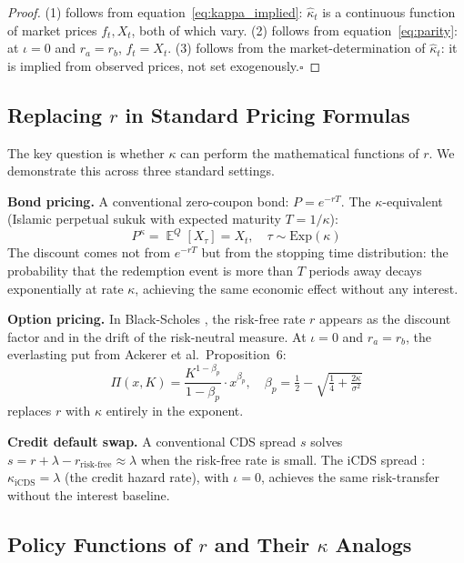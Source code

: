 \documentclass[10pt,twocolumn]{article}
\theoremstyle{plain}
\theoremstyle{definition}
\DeclareMathOperator{\E}{\mathbb{E}}
\begin{document}
\begin{proof}
(1) follows from equation~\eqref{eq:kappa_implied}: $\hat\kappa_t$
is a continuous function of market prices $f_t, X_t$, both of
which vary. (2) follows from equation~\eqref{eq:parity}: at
$\iota = 0$ and $r_a = r_b$, $f_t = X_t$. (3) follows from the
market-determination of $\hat\kappa_t$: it is implied from
observed prices, not set exogenously.\qquad$\square$
\end{proof}

\subsection{Replacing $r$ in Standard Pricing Formulas}

The key question is whether $\kappa$ can perform the mathematical
functions of $r$. We demonstrate this across three standard
settings.

\textbf{Bond pricing.}
A conventional zero-coupon bond: $P = e^{-rT}$.
The $\kappa$-equivalent (Islamic perpetual sukuk with expected
maturity $T = 1/\kappa$):
\begin{equation}
P^{\kappa} = \E^Q[X_\tau] = X_t, \quad \tau\sim\mathrm{Exp}(\kappa)
\label{eq:kappa_bond}
\end{equation}
The discount comes not from $e^{-rT}$ but from the stopping time
distribution: the probability that the redemption event is more
than $T$ periods away decays exponentially at rate $\kappa$,
achieving the same economic effect without any interest.

\textbf{Option pricing.}
In Black-Scholes \cite{BlackScholes1973}, the risk-free rate
$r$ appears as the discount factor and in the drift of the
risk-neutral measure. At $\iota = 0$ and $r_a = r_b$, the
everlasting put from Ackerer et al.\ Proposition~6:
\begin{equation}
\Pi(x,K) = \frac{K^{1-\beta_p}}{1-\beta_p}\cdot x^{\beta_p},
\quad \beta_p = \tfrac{1}{2}
- \sqrt{\tfrac{1}{4} + \tfrac{2\kappa}{\sigma^2}}
\label{eq:evput}
\end{equation}
replaces $r$ with $\kappa$ entirely in the exponent.

\textbf{Credit default swap.}
A conventional CDS spread $s$ solves $s = r + \lambda - r_{\text{risk-free}}
\approx \lambda$ when the risk-free rate is small.
The iCDS spread \cite{Ahmed2026b}: $\kappa_{\text{iCDS}} = \lambda$
(the credit hazard rate), with $\iota = 0$, achieves the same
risk-transfer without the interest baseline.

\subsection{Policy Functions of $r$ and Their $\kappa$ Analogs}
\end{document}
